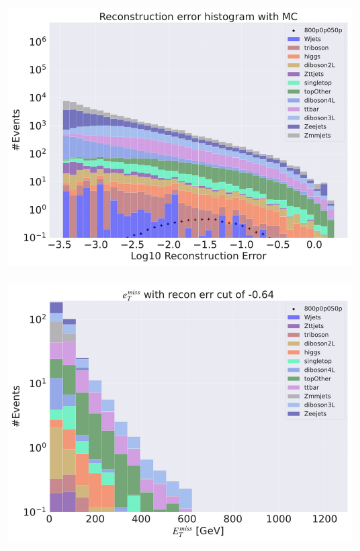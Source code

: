 \begin{figure}[H]
    \centering
    \begin{subfigure}{.40\textwidth}
        \includegraphics[width=\textwidth]{Figures/AE_testing/big/3lep/b_data_recon_big_rm3_feats_sig_800p0p050p.pdf}
        \caption{ }
        \label{fig:AE_3lep_big_800_3}
    \end{subfigure}
    \hfill
    \begin{subfigure}{.40\textwidth}
        \includegraphics[width=\textwidth]{Figures/AE_testing/big/3lep/b_data_recon_big_rm3_feats_sig_800p0p050p_etmiss_recon_errcut_-0.64.pdf}
        \caption{}
        \label{fig:AE_3lep_big_etmiss_800_3}
    \end{subfigure}

\end{figure}
